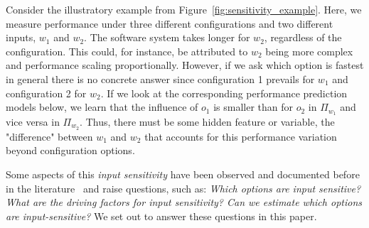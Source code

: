{{ Consider the illustratory example from Figure~\ref{fig:sensitivity_example}. Here, we measure performance under three different configurations and two different inputs, $w_1$ and $w_2$. The software system takes longer for $w_2$, regardless of the configuration. This could, for instance, be attributed to $w_2$ being more complex and performance scaling proportionally. However, if we ask which option is fastest in general there is no concrete answer since configuration 1 prevails for $w_1$ and configuration 2 for $w_2$. If we look at the corresponding performance prediction models below, we learn that the influence of $o_1$ is smaller than for $o_2$ in $\Pi_{w_1}$ and vice versa in $\Pi_{w_2}$. Thus, there must be some hidden feature or variable, the "difference" between $w_1$ and $w_2$ that accounts for this performance variation beyond configuration options.
}



Some aspects of this \emph{input sensitivity} have been observed and documented before in the literature~\cite{liao_2020_using_emse,alves_sampling_2020,jamishidi_transfer_2017} and raise questions, such as: \textit{Which options are input sensitive? What are the driving factors for input sensitivity? Can we estimate which options are input-sensitive?} We set out to answer these questions in this paper.
	
}
